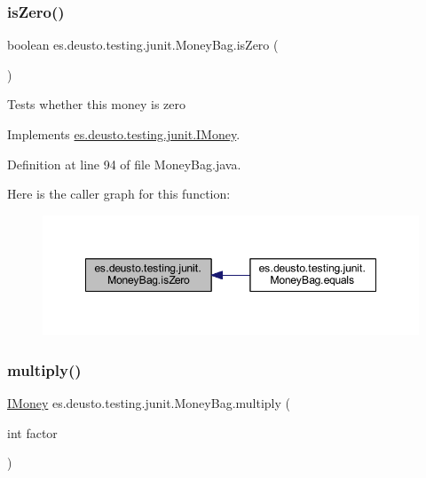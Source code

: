 \subsubsection{\texorpdfstring{is\+Zero()}{isZero()}}
{\footnotesize\ttfamily boolean es.\+deusto.\+testing.\+junit.\+Money\+Bag.\+is\+Zero (\begin{DoxyParamCaption}{ }\end{DoxyParamCaption})}

Tests whether this money is zero 

Implements \hyperlink{interfacees_1_1deusto_1_1testing_1_1junit_1_1_i_money_a166c39b6f931e49769580a04f8c73500}{es.\+deusto.\+testing.\+junit.\+I\+Money}.



Definition at line 94 of file Money\+Bag.\+java.

Here is the caller graph for this function\+:
\nopagebreak
\begin{figure}[H]
\begin{center}
\leavevmode
\includegraphics[width=348pt]{classes_1_1deusto_1_1testing_1_1junit_1_1_money_bag_abebc5bc39c3343cb3c4e5fb291fd5893_icgraph}
\end{center}
\end{figure}
\mbox{\label{classes_1_1deusto_1_1testing_1_1junit_1_1_money_bag_aa20ce4cc70c2ba0bc9a5ccb96635d506}} 
\subsubsection{\texorpdfstring{multiply()}{multiply()}}
{\footnotesize\ttfamily \hyperlink{interfacees_1_1deusto_1_1testing_1_1junit_1_1_i_money}{I\+Money} es.\+deusto.\+testing.\+junit.\+Money\+Bag.\+multiply (\begin{DoxyParamCaption}\item[{int}]{factor }\end{DoxyParamCaption})}

